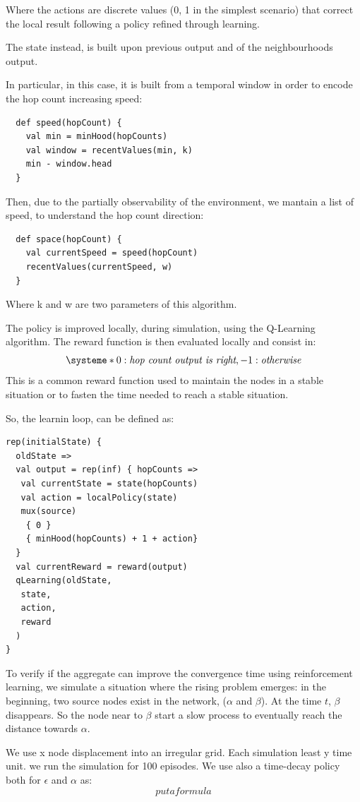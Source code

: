 \documentclass[
  twocolumn,
]{ceurart}
\begin{document}
Where the actions are discrete values (0, 1 in the simplest scenario) that correct the local result following a policy refined through learning.

The state instead, is built upon previous output and of the neighbourhoods output.

In particular, in this case, it is built from a temporal window in order to encode the hop count increasing speed:
\begin{verbatim}
  def speed(hopCount) {
    val min = minHood(hopCounts)
    val window = recentValues(min, k)
    min - window.head 
  }
\end{verbatim}
Then, due to the partially observability of the environment, we mantain a 
 list of speed, to understand the hop count direction:

 \begin{verbatim}
  def space(hopCount) {
    val currentSpeed = speed(hopCount)
    recentValues(currentSpeed, w)
  }
\end{verbatim}

Where k and w are two parameters of this algorithm.

The policy is improved locally, during simulation, using the Q-Learning algorithm. 
The reward function is then evaluated locally and consist in: 
\[
\systeme*{0 : \textit{hop count output is right}, -1 : \textit{otherwise}}
\]
This is a common reward function used to maintain the nodes in a stable situation or to
fasten the time needed to reach a stable situation.

So, the learnin loop, can be defined as:
\begin{verbatim}
rep(initialState) {
  oldState =>
  val output = rep(inf) { hopCounts => 
   val currentState = state(hopCounts)
   val action = localPolicy(state)
   mux(source) 
    { 0 } 
    { minHood(hopCounts) + 1 + action} 
  }
  val currentReward = reward(output)
  qLearning(oldState, 
   state, 
   action, 
   reward
  )
}
\end{verbatim}

To verify if the aggregate can improve the convergence time using reinforcement learning,
we simulate a situation where the rising problem emerges:
in the beginning, two source nodes exist in the network, ($\alpha$ and $\beta$).
At the time $t$, $\beta$ disappears. So the node near to $\beta$ start a slow process
to eventually reach the distance towards $\alpha$.

We use x node displacement into an irregular grid. Each simulation least y time unit.
 we run the simulation for 100 episodes.
 We use also a time-decay policy both for $\epsilon$ and $\alpha$ as:
$$
put a formula
$$
\end{document}
